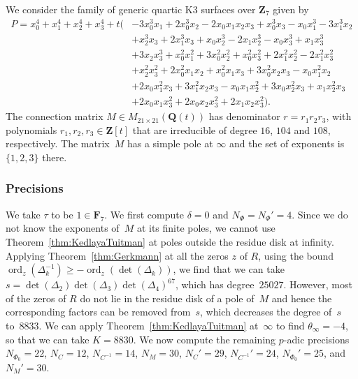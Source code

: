 \documentclass[a4paper,11pt]{article}
\numberwithin{equation}{section}
\newcommand{\ZZ}{\mathbf{Z}} %
\newcommand{\QQ}{\mathbf{Q}} %
\newcommand{\FF}{\mathbf{F}} %
\DeclareMathOperator{\ord}{ord}          %
\theoremstyle{definition}
\begin{document}
We consider the family of generic quartic K3 surfaces over $\ZZ_{7}$ given by 
\begin{equation*}
\begin{split}
P=x_0^4 + x_1^4 + x_2^4 + x_3^4 
+ t \bigl( & -3 x_0^3 x_1 + 2 x_0^3 x_2 - 2 x_0 x_1 x_2 x_3 + x_0^3 x_3 - x_0 x_1^3 - 3 x_1^3 x_2 \\ 
           & + x_2^3 x_3 + 2 x_1^3 x_3 + x_0 x_2^3 - 2 x_1 x_2^3 - x_0 x_3^3 + x_1 x_3^3 \\
           & + 3 x_2 x_3^3 + x_0^2 x_1^2 + 3 x_0^2 x_2^2 + x_0^2 x_3^2 + 2 x_1^2 x_2^2 - 2 x_1^2 x_3^2 \\
           & + x_2^2 x_3^2 + 2 x_0^2 x_1 x_2 + x_0^2 x_1 x_3 + 3 x_0^2 x_2 x_3 - x_0 x_1^2 x_2 \\
           & + 2 x_0 x_1^2 x_3 + 3 x_1^2 x_2 x_3 - x_0 x_1 x_2^2 + 3 x_0 x_2^2 x_3 + x_1 x_2^2 x_3 \\
           & + 2 x_0 x_1 x_3^2 + 2 x_0 x_2 x_3^2 + 2 x_1 x_2 x_3^2 \bigr).
\end{split}
\end{equation*}
The connection matrix $M \in M_{21 \times 21}(\QQ(t))$ has denominator 
$r = r_1 r_2 r_3$, with polynomials $r_1,r_2,r_3 \in \ZZ[t]$ that are 
irreducible of degree $16$, $104$ and $108$, respectively.  The matrix~$M$ 
has a simple pole at $\infty$ and the set of exponents is $\{1,2,3\}$ there.

\subsubsection{Precisions}

We take $\tau$ to be  $1 \in \FF_7$. We first compute $\delta=0$ and 
$N_{\Phi}=N_{\Phi}'=4$. Since we do not know the exponents of~$M$ at 
its finite poles, we cannot use Theorem~\ref{thm:KedlayaTuitman} at poles 
outside the residue disk at infinity. Applying Theorem~\ref{thm:Gerkmann} 
at all the zeros $z$ of $R$, using the bound 
$\ord_z(\Delta_k^{-1}) \geq -\ord_z(\det(\Delta_k))$, we find that we can 
take $s = \det(\Delta_2)\det(\Delta_3)\det(\Delta_4)^{67}$, which has 
degree~$25027$. However, most of the zeros of $R$ do not lie in the 
residue disk of a pole of~$M$ and hence the corresponding factors can 
be removed from~$s$, which decreases the degree of~$s$ to~$8833$.  
We can apply Theorem~\ref{thm:KedlayaTuitman} at~$\infty$ to find 
$\theta_{\infty}=-4$, so that we can take $K=8830$. We now compute 
the remaining $p$-adic precisions $N_{\Phi_0}=22$, $N_C=12$, $N_{C^{-1}}=14$, 
$N_M=30$, $N_C'=29$, $N_{C^{-1}}'=24$, $N_{\Phi_0}'=25$, and $N_M'=30$.
\end{document}
